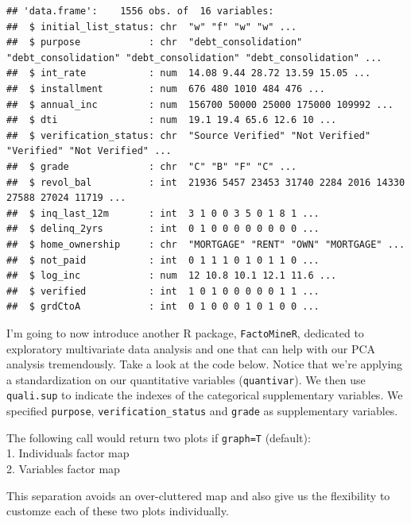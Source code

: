 \documentclass[]{article}
\newenvironment{Shaded}{\begin{snugshade}}{\end{snugshade}}
\newcommand{\CommentTok}[1]{\textcolor[rgb]{0.56,0.35,0.01}{\textit{#1}}}
\newcommand{\DataTypeTok}[1]{\textcolor[rgb]{0.13,0.29,0.53}{#1}}
\newcommand{\DecValTok}[1]{\textcolor[rgb]{0.00,0.00,0.81}{#1}}
\newcommand{\KeywordTok}[1]{\textcolor[rgb]{0.13,0.29,0.53}{\textbf{#1}}}
\newcommand{\NormalTok}[1]{#1}
\newcommand{\OperatorTok}[1]{\textcolor[rgb]{0.81,0.36,0.00}{\textbf{#1}}}
\newcommand{\StringTok}[1]{\textcolor[rgb]{0.31,0.60,0.02}{#1}}
\begin{document}
\begin{verbatim}
## 'data.frame':    1556 obs. of  16 variables:
##  $ initial_list_status: chr  "w" "f" "w" "w" ...
##  $ purpose            : chr  "debt_consolidation" "debt_consolidation" "debt_consolidation" "debt_consolidation" ...
##  $ int_rate           : num  14.08 9.44 28.72 13.59 15.05 ...
##  $ installment        : num  676 480 1010 484 476 ...
##  $ annual_inc         : num  156700 50000 25000 175000 109992 ...
##  $ dti                : num  19.1 19.4 65.6 12.6 10 ...
##  $ verification_status: chr  "Source Verified" "Not Verified" "Verified" "Not Verified" ...
##  $ grade              : chr  "C" "B" "F" "C" ...
##  $ revol_bal          : int  21936 5457 23453 31740 2284 2016 14330 27588 27024 11719 ...
##  $ inq_last_12m       : int  3 1 0 0 3 5 0 1 8 1 ...
##  $ delinq_2yrs        : int  0 1 0 0 0 0 0 0 0 0 ...
##  $ home_ownership     : chr  "MORTGAGE" "RENT" "OWN" "MORTGAGE" ...
##  $ not_paid           : int  0 1 1 1 0 1 0 1 1 0 ...
##  $ log_inc            : num  12 10.8 10.1 12.1 11.6 ...
##  $ verified           : int  1 0 1 0 0 0 0 0 1 1 ...
##  $ grdCtoA            : int  0 1 0 0 0 1 0 1 0 0 ...
\end{verbatim}

I'm going to now introduce another R package, \texttt{FactoMineR},
dedicated to exploratory multivariate data analysis and one that can
help with our PCA analysis tremendously. Take a look at the code below.
Notice that we're applying a standardization on our quantitative
variables (\texttt{quantivar}). We then use \texttt{quali.sup} to
indicate the indexes of the categorical supplementary variables. We
specified \texttt{purpose}, \texttt{verification\_status} and
\texttt{grade} as supplementary variables.

The following call would return two plots if \texttt{graph=T}
(default):\\
1. Individuals factor map\\
2. Variables factor map

This separation avoids an over-cluttered map and also give us the
flexibility to customze each of these two plots individually.

\begin{Shaded}
\end{Shaded}
\end{document}
